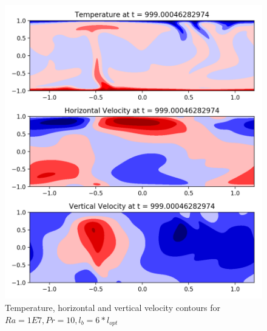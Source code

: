 \documentclass[12pt]{article}
\begin{document}
     
     \begin{figure}[!htb]
     	\includegraphics[width=\linewidth]{contours_1E7_10_6.png}
     	\caption{Temperature, horizontal and vertical velocity contours for $Ra = 1E7, Pr =10, l_b = 6* l_{opt} $ }
     	\label{fig:fig20}
     \end{figure}
     
\end{document}
